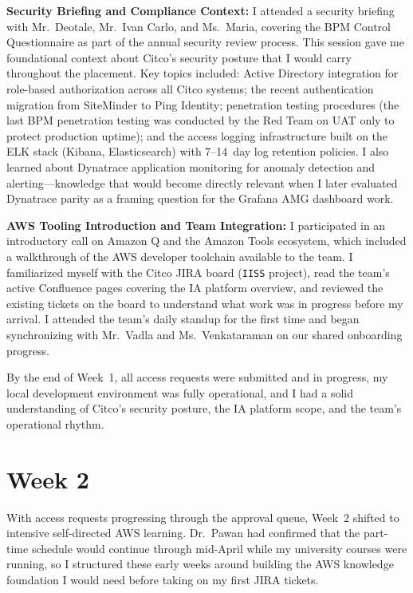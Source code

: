 \textbf{Security Briefing and Compliance Context:}
I attended a security briefing with Mr.\ Deotale, Mr.\ Ivan Carlo, and Ms.\ Maria, covering the BPM Control Questionnaire as part of the annual security review process. This session gave me foundational context about Citco's security posture that I would carry throughout the placement. Key topics included: Active Directory integration for role-based authorization across all Citco systems; the recent authentication migration from SiteMinder to Ping Identity; penetration testing procedures (the last BPM penetration testing was conducted by the Red Team on UAT only to protect production uptime); and the access logging infrastructure built on the ELK stack (Kibana, Elasticsearch) with 7--14~day log retention policies. I also learned about Dynatrace application monitoring for anomaly detection and alerting---knowledge that would become directly relevant when I later evaluated Dynatrace parity as a framing question for the Grafana AMG dashboard work.

\textbf{AWS Tooling Introduction and Team Integration:}
I participated in an introductory call on Amazon Q and the Amazon Tools ecosystem, which included a walkthrough of the AWS developer toolchain available to the team. I familiarized myself with the Citco JIRA board (\texttt{IISS} project), read the team's active Confluence pages covering the IA platform overview, and reviewed the existing tickets on the board to understand what work was in progress before my arrival. I attended the team's daily standup for the first time and began synchronizing with Mr.\ Vadla and Ms.\ Venkataraman on our shared onboarding progress.

By the end of Week~1, all access requests were submitted and in progress, my local development environment was fully operational, and I had a solid understanding of Citco's security posture, the IA platform scope, and the team's operational rhythm.


\FloatBarrier

\section{Week 2}
\label{sec:week2}

With access requests progressing through the approval queue, Week~2 shifted to intensive self-directed AWS learning. Dr.\ Pawan had confirmed that the part-time schedule would continue through mid-April while my university courses were running, so I structured these early weeks around building the AWS knowledge foundation I would need before taking on my first JIRA tickets.

